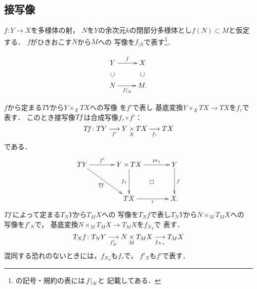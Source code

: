 \subsection*{接写像}
\(f\colon Y\to X\)を多様体の射，
\(N\)を\(Y\)の余次元\(k\)の閉部分多様体とし\(
    f(N)\subset M
\)と仮定する．
\(f\)がひきおこす\(N\)から\(M\)への
写像を\(f_{|N}\)で表す\footnote{
    \cite[p.503]{KS90}の記号・規約の表には\(\mres[f]{N}\)と
    記載してある．
}．

\[
    \vcenter{\xymatrix@C=26pt@R=20pt{
    Y
    \ar[r]^-{f}
    &
    X
    \\
    N
    \ar@{}[u]|{\rotatebox{90}{\(\subset\)}}
    \ar[r]_-{\mres[f]{N}}
    &
    \ar@{}[u]|{\rotatebox{90}{\(\subset\)}}
    M.
  }}
\]

\(f\)から定まる\(TY\)から\(Y\times_{X}TX\)への写像
を\(f'\)で表し
基底変換\(Y\times_{X}TX\to TX\)を\(f_{\tau}\)で表す．
このとき接写像\(\mtan[f]\)は合成写像\(f_{\tau}\circ f'\)：
\begin{equation}
    \mtan[f]\colon TY\underset{f'}{\longrightarrow}
    Y\pb[X]TX\underset{f_{\tau}}{\longrightarrow} TX
\end{equation}
である．
\[
    \vcenter{\xymatrix@C=36pt@R=36pt{
    TY
    \ar[rd]_-{\mtan[f]}
    \ar[r]^-{f'}
    &
    Y\times TX
    \ar@{}[dr]|\square
    \ar[d]_-{f_{\tau}}
    \ar[r]^-{\pr_1}
    &
    Y
    \ar[d]^-{f}
    \\
    &
    TX
    \ar[r]_-{\tau}
    &
    X.
  }}
\]
\(\mtan[f]\)によって定まる\(T_{N}Y\)から\(T_{M}X\)への
写像を\(T_{N}f\)で表し\(T_{N}Y\)から\(N\times_{M}T_{M}X\)への
写像を\(f'_{N}\)で，
基底変換\(N\times_{M}T_{M}X\to T_{M}X\)を\({f_{N}}_{\tau}\)で
表す．
\begin{equation}
    T_{N}f\colon T_{N}Y\underset{f'_{N}}{\longrightarrow}
    N\pb[M]T_{M}X\underset{{f_{N}}_{\tau}}{\longrightarrow} T_{M}X
\end{equation}
混同する恐れのないときには，\({f_{N}}_{\tau}\)も\(f_{\tau}\)で，
\({f'_{N}}\)も\(f'\)で表す．

